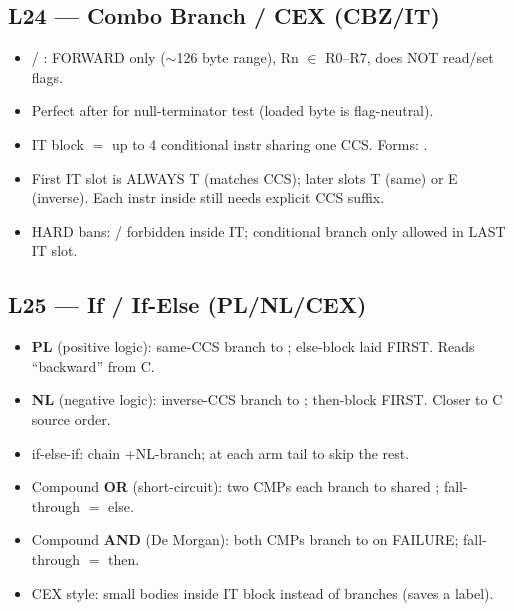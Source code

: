 \subsection{L24 --- Combo Branch / CEX (CBZ/IT)}
\begin{itemize}
\item {} / : FORWARD only ($\sim$126 byte range), Rn $\in$ R0--R7, does NOT read/set flags.
\item Perfect after  for null-terminator test (loaded byte is flag-neutral).
\item IT block $=$ up to 4 conditional instr sharing one CCS. Forms: .
\item First IT slot is ALWAYS T (matches CCS); later slots T (same) or E (inverse). Each instr inside still needs explicit CCS suffix.
\item HARD bans: / forbidden inside IT; conditional branch only allowed in LAST IT slot.
\end{itemize}

\subsection{L25 --- If / If-Else (PL/NL/CEX)}
\begin{itemize}
\item \textbf{PL} (positive logic): same-CCS branch to ; else-block laid FIRST. Reads ``backward'' from C.
\item \textbf{NL} (negative logic): inverse-CCS branch to ; then-block FIRST. Closer to C source order.
\item if-else-if: chain +NL-branch;  at each arm tail to skip the rest.
\item Compound \textbf{OR} (short-circuit): two CMPs each branch to shared ; fall-through $=$ else.
\item Compound \textbf{AND} (De Morgan): both CMPs branch to  on FAILURE; fall-through $=$ then.
\item CEX style: small bodies inside IT block instead of branches (saves a label).
\end{itemize}

